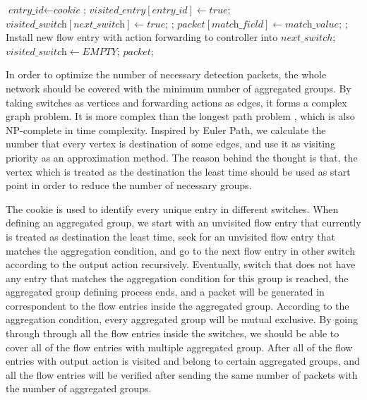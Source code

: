 \begin {tcolorbox}[blanker,float=tbp,
grow to left by=1cm, grow to right by=1cm]
\begin{algorithm}[H]
  \begin{algorithmic}[1]
        \State $\textit{entry\_id} \gets \textit{cookie}$;
          \State $\textit{visited\_entry}[\textit{entry\_id}] \gets true$;
          \State $\textit{visited\_switch}[\textit{next\_switch}] \gets true$;
            \State \Return {};
            \State $\textit{packet}[\textit{match\_field}] \gets \textit{match\_value}$;
            \State \Return {};
          \EndIf
        \EndIf
      \EndFor
      \State Install new flow entry with action forwarding to controller into $next\_switch$;
      \State $\textit{visited\_switch} \gets EMPTY$;
      \State \Return $packet$;
    \EndFunction
  \end{algorithmic}
\end{algorithm}
\end{tcolorbox}

In order to optimize the number of necessary detection packets, the whole network should be covered with the minimum number of aggregated groups. By taking switches as vertices and forwarding actions as edges, it forms a complex graph problem. It is more complex than the longest path problem , which is also NP-complete in time complexity. Inspired by Euler Path, we calculate the number that every vertex is destination of some edges, and use it as visiting priority as an approximation method. The reason behind the thought is that, the vertex which is treated as the destination the least time should be used as start point in order to reduce the number of necessary groups.

The cookie is used to identify every unique entry in different switches. When defining an aggregated group, we start with an unvisited flow entry that currently is treated as destination the least time, seek for an unvisited flow entry that matches the aggregation condition, and go to the next flow entry in other switch according to the output action recursively. Eventually, switch that does not have any entry that matches the aggregation condition for this group is reached, the aggregated group defining process ends, and a packet will be generated in correspondent to the flow entries inside the aggregated group. According to the aggregation condition, every aggregated group will be mutual exclusive. By going through through all the flow entries inside the switches, we should be able to cover all of the flow entries with multiple aggregated group. After all of the flow entries with output action is visited and belong to certain aggregated groups, and all the flow entries will be verified after sending the same number of packets with the number of aggregated groups. 

